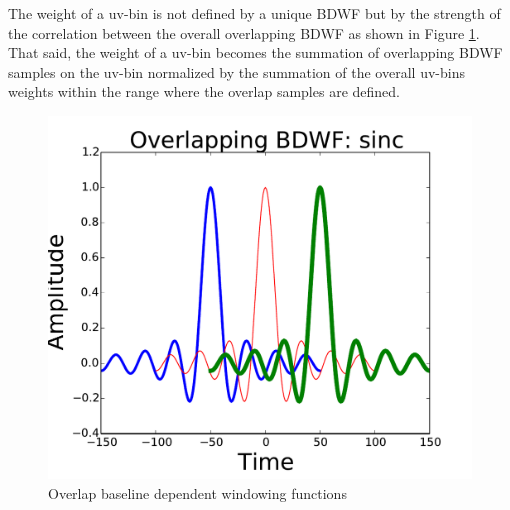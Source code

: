 \documentclass[useAMS,usenatbib]{mn2e}
\newtheorem{definition}[theorem]{Definition}
\begin{document}
The weight of a uv-bin is not defined by a unique BDWF but by the 
strength of the correlation between the overall  overlapping BDWF as shown in Figure \ref{fig:corrSigVLAMxBl_overlapGdelta}. 
That said, the weight of a uv-bin becomes the summation of overlapping BDWF samples on the uv-bin normalized by the summation of the 
overall uv-bins weights within the range where the overlap samples are defined.
\begin{figure} 
\includegraphics[width=1\columnwidth]{./Figures/corrSigVLAMxBl_overlapGdelta.pdf}\caption{Overlap 
baseline dependent windowing functions}\label{fig:corrSigVLAMxBl_overlapGdelta}
\end{figure}
\end{document}
